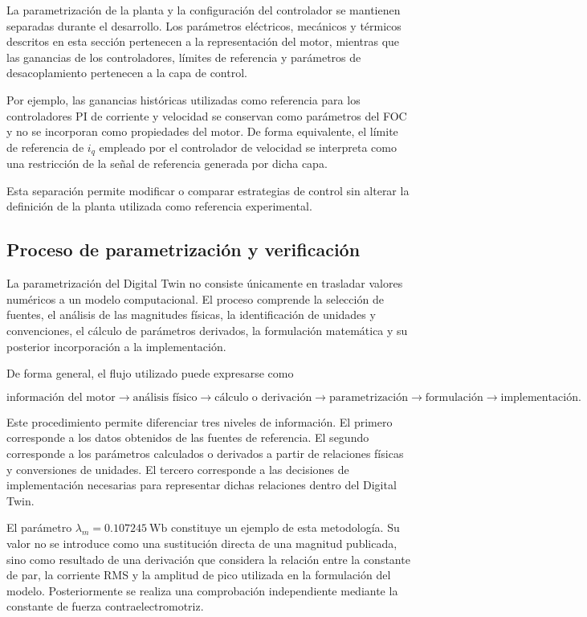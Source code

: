 La parametrización de la planta y la configuración del controlador se mantienen separadas durante el desarrollo. Los parámetros eléctricos, mecánicos y térmicos descritos en esta sección pertenecen a la representación del motor, mientras que las ganancias de los controladores, límites de referencia y parámetros de desacoplamiento pertenecen a la capa de control.

Por ejemplo, las ganancias históricas utilizadas como referencia para los controladores PI de corriente y velocidad se conservan como parámetros del FOC y no se incorporan como propiedades del motor. De forma equivalente, el límite de referencia de $i_q$ empleado por el controlador de velocidad se interpreta como una restricción de la señal de referencia generada por dicha capa.

Esta separación permite modificar o comparar estrategias de control sin alterar la definición de la planta utilizada como referencia experimental.

\subsection{Proceso de parametrización y verificación}

La parametrización del Digital Twin no consiste únicamente en trasladar valores numéricos a un modelo computacional. El proceso comprende la selección de fuentes, el análisis de las magnitudes físicas, la identificación de unidades y convenciones, el cálculo de parámetros derivados, la formulación matemática y su posterior incorporación a la implementación.

De forma general, el flujo utilizado puede expresarse como

\begin{equation}
\text{información del motor}
\rightarrow
\text{análisis físico}
\rightarrow
\text{cálculo o derivación}
\rightarrow
\text{parametrización}
\rightarrow
\text{formulación}
\rightarrow
\text{implementación}.
\end{equation}

Este procedimiento permite diferenciar tres niveles de información. El primero corresponde a los datos obtenidos de las fuentes de referencia. El segundo corresponde a los parámetros calculados o derivados a partir de relaciones físicas y conversiones de unidades. El tercero corresponde a las decisiones de implementación necesarias para representar dichas relaciones dentro del Digital Twin.

El parámetro $\lambda_m=0.107245~\mathrm{Wb}$ constituye un ejemplo de esta metodología. Su valor no se introduce como una sustitución directa de una magnitud publicada, sino como resultado de una derivación que considera la relación entre la constante de par, la corriente RMS y la amplitud de pico utilizada en la formulación del modelo. Posteriormente se realiza una comprobación independiente mediante la constante de fuerza contraelectromotriz.

